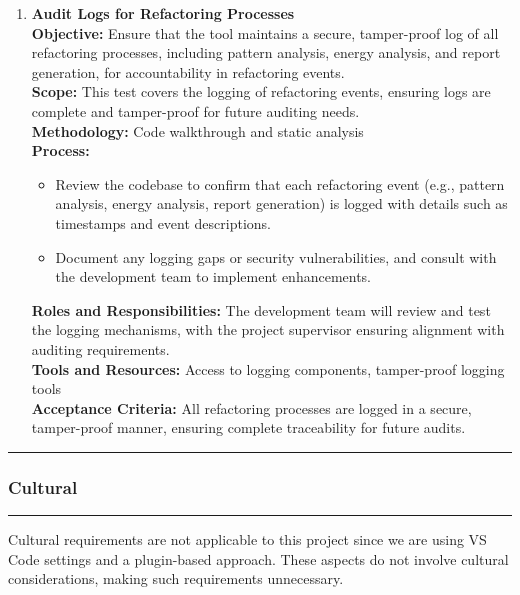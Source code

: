 \documentclass[12pt, titlepage]{article}
\newcommand{\colorrule}{\textcolor{BlueViolet}{\rule{\linewidth}{2pt}}}
\begin{document}
  \begin{enumerate}[label={\bf
      \textcolor{Maroon}{test-SRT-\arabic*}}, wide=0pt, font=\itshape]
    \item \textbf{Audit Logs for Refactoring Processes} \\[2mm]
      \textbf{Objective:} Ensure that the tool maintains a secure,
      tamper-proof log of all refactoring processes, including
      pattern analysis, energy analysis, and report generation, for
      accountability in refactoring events. \\[2mm]
      \textbf{Scope:} This test covers the logging of refactoring
      events, ensuring logs are complete and tamper-proof for future
      auditing needs. \\[2mm]
      \textbf{Methodology:} Code walkthrough and static analysis \\[2mm]
      \textbf{Process:}
      \begin{itemize}
        \item Review the codebase to confirm that each refactoring
          event (e.g., pattern analysis, energy analysis, report
          generation) is logged with details such as timestamps and
          event descriptions.
        \item Document any logging gaps or security vulnerabilities,
          and consult with the development team to implement enhancements.
      \end{itemize}
      \textbf{Roles and Responsibilities:} The development team will
      review and test the logging mechanisms, with the project
      supervisor ensuring alignment with auditing requirements. \\[2mm]
      \textbf{Tools and Resources:} Access to logging components,
      tamper-proof logging tools \\[2mm]
      \textbf{Acceptance Criteria:} All refactoring processes are
      logged in a secure, tamper-proof manner, ensuring complete
      traceability for future audits.
  \end{enumerate}
  \newpage

  \noindent
  \colorrule

  \subsubsection{Cultural}
  \colorrule

  \medskip

  \noindent
  Cultural requirements are not applicable to this project since we
  are using VS Code settings and a plugin-based approach. These
  aspects do not involve cultural considerations, making such
  requirements unnecessary.
\end{document}
